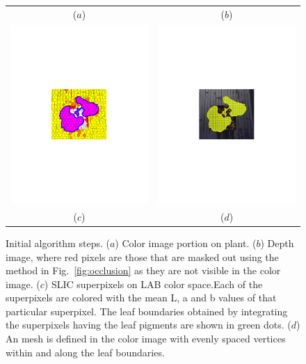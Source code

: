 \begin{figure}
\begin{center}
\begin{tabular}{cc}
($a$) & ($b$) \\
\includegraphics[trim=190 280 190 290,clip,width=0.47\linewidth]{Figures/slic_cropped2} &
\includegraphics[trim=190 280 190 290,clip,width=0.47\linewidth]{Figures/beanColorMesh} \\
($c$) & ($d$) \\
\end{tabular}
\end{center}
\caption{Initial algorithm steps.  ($a$) Color image portion on plant.  ($b$) Depth image, where red pixels are those that are masked out using the method in Fig.~\ref{fig:occlusion} as they are not visible in the color image. ($c$) SLIC superpixels on LAB color space.Each of the superpixels are colored with the mean L, a and b values of that particular superpixel. The leaf boundaries obtained by integrating the superpixels having the leaf pigments are shown in green dots. ($d$) An mesh is defined in the color image with evenly spaced vertices within and along the leaf boundaries. }
\label{fig:beanimageprocess}
\end{figure}

